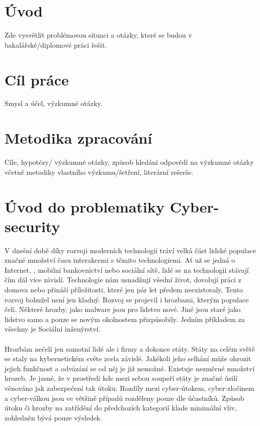 \section{Úvod}


Zde vysvětlit problémovou situaci a otázky, které se budou v bakalářské/diplomové práci řešit.

\section{Cíl práce}


Smysl a účel, výzkumné otázky.

\section{Metodika zpracování}


Cíle, hypotézy/ výzkumné otázky, způsob hledání odpovědí na výzkumné otázky včetně metodiky vlastního výzkumu/šetření, literární rešerše.

\section{Úvod do problematiky Cyber-security}
V dnešní době díky rozvoji moderních technologií tráví velká část lidské populace značné množství času interakcemi s těmito technologiemi.
Ať už se jedná o Internet, , mobilní bankovnictví nebo sociální sítě, lidé se na technologií stávají čím dál více závislí.
Technologie nám usnadňují všední život, dovolují práci z domova nebo přináší příležitosti, které jen pár let předem neexistovaly.
Tento rozvoj bohužel není jen kladný.
Rozvoj se projevil i hrozbami, kterým populace čelí.
Některé hrozby, jako malware jsou pro lidstvo nové.
Jiné jsou staré jako lidstvo samo a pouze se novým okolnostem přizpůsobily.
Jedním příkladem za všechny je Sociální inženýrství.

\paragraph{}
Hrozbám nečelí jen samotní lidé ale i firmy a dokonce státy.
Státy na celém světě se staly na kybernetickém světe zcela závislé.\cite{LI20218176}
Jakékoli jeho selhání může ohrozit jejich funkčnost a odvázání se od něj je již nemožné.
Existuje nezměrné množství hrozeb.
Je jasné, že v prostředí kde mezi sebou soupeří státy je značné úsilí věnováno jak zabezpečení tak útoku.
Rozdíly mezi cyber-útokem, cyber-zločinem a cyber-válkou jsou ve většině případů rozděleny pouze dle účastníků.\cite{LI20218176}
Způsob útoku či hrozby na zatřídění do předchozích kategorií klade minimální vliv, zohledněn bývá pouze výsledek.


